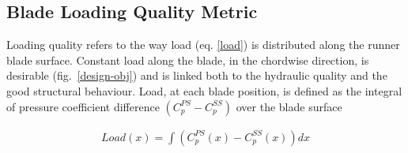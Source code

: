 


\subsection{Blade Loading Quality Metric}
Loading quality refers to the way load (eq. \ref{load}) is distributed along the runner blade surface. Constant load along the blade, in the chordwise direction, is desirable (fig.\ \ref{design-obj}) and is linked both to the hydraulic quality and the good structural behaviour. Load, at each blade position, is defined as the integral of pressure coefficient difference $(C_p^{PS}-C_p^{SS})$ over the blade surface 

\begin{align} 
   Load(x)=\int (C_p^{PS}(x)-C_p^{SS}(x)) dx 
\label{load}
\end{align}

  


